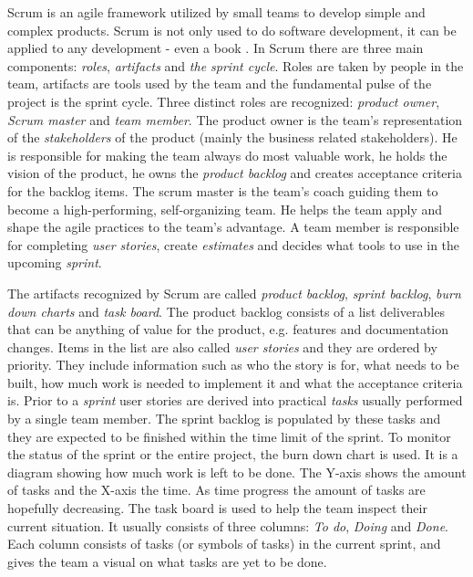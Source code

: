 Scrum is an agile framework utilized by small teams to develop simple and
complex products. Scrum is not only used to do software development, it can be
applied to any development - even a book \cite{sims2012scrum}. In Scrum there
are three main components: \textit{roles}, \textit{artifacts} and \textit{the
sprint cycle}. Roles are taken by people in the team, artifacts are tools used
by the team and the fundamental pulse of the project is the sprint cycle. Three
distinct roles are recognized: \textit{product owner}, \textit{Scrum master}
and \textit{team member}. The product owner is the team's representation of the
\textit{stakeholders} of the product (mainly the business related
stakeholders). He is responsible for making the team always do most valuable
work, he holds the vision of the product, he owns the \textit{product backlog}
and creates acceptance criteria for the backlog items. The scrum master is the
team's coach guiding them to become a high-performing, self-organizing team. He
helps the team apply and shape the agile practices to the team's advantage. A
team member is responsible for completing \textit{user stories}, create
\textit{estimates} and decides what tools to use in the upcoming
\textit{sprint}. \cite{sims2012scrum}

The artifacts recognized by Scrum are called \textit{product backlog},
\textit{sprint backlog}, \textit{burn down charts} and \textit{task board}. The
product backlog consists of a list deliverables that can be anything of value
for the product, e.g. features and documentation changes. Items in the list are
also called \textit{user stories} and they are ordered by priority. They
include information such as who the story is for, what needs to be built, how
much work is needed to implement it and what the acceptance criteria is. Prior
to a \textit{sprint} user stories are derived into practical \textit{tasks}
usually performed by a single team member. The sprint backlog is populated by
these tasks and they are expected to be finished within the time limit of the
sprint. To monitor the status of the sprint or the entire project, the burn
down chart is used. It is a diagram showing how much work is left to be done.
The Y-axis shows the amount of tasks and the X-axis the time. As time progress
the amount of tasks are hopefully decreasing. The task board is used to help
the team inspect their current situation. It usually consists of three columns:
\textit{To do}, \textit{Doing} and \textit{Done}. Each column consists of tasks
(or symbols of tasks) in the current sprint, and gives the team a visual on
what tasks are yet to be done. \cite{sims2012scrum}

